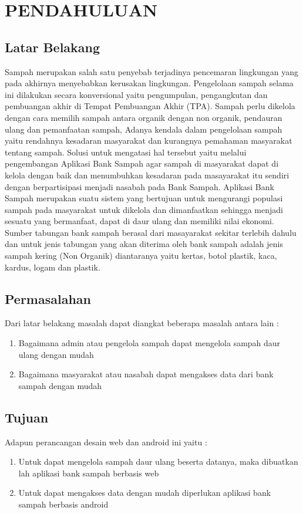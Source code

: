 \chapter{PENDAHULUAN}
\section{Latar Belakang}
\label{sec:latarbelakang} %

Sampah merupakan salah satu penyebab terjadinya pencemaran lingkungan yang pada akhirnya menyebabkan kerusakan lingkungan. Pengelolaan sampah selama ini dilakukan secara konversional yaitu pengumpulan, pengangkutan dan pembuangan akhir di Tempat Pembuangan Akhir (TPA). Sampah perlu dikelola dengan cara memilih sampah antara organik dengan non organik, pendauran ulang dan pemanfaatan sampah, Adanya kendala dalam pengelolaan sampah yaitu rendahnya kesadaran masyarakat dan kurangnya pemahaman masyarakat tentang sampah. Solusi untuk mengatasi hal tersebut yaitu melalui pengembangan Aplikasi Bank Sampah agar sampah di masyarakat dapat di kelola dengan baik dan menumbuhkan kesadaran pada masayarakat itu sendiri dengan berpartisipasi menjadi nasabah pada Bank Sampah.     
Aplikasi Bank Sampah merupakan suatu sistem yang bertujuan untuk mengurangi populasi sampah pada masyarakat untuk dikelola dan dimanfaatkan sehingga menjadi sesuatu yang bermanfaat, dapat di daur ulang dan memiliki nilai ekonomi. Sumber tabungan bank sampah berasal dari masayarakat sekitar terlebih dahulu dan untuk jenis tabungan yang akan diterima oleh bank sampah adalah jenis sampah kering (Non Organik) diantaranya yaitu kertas, botol plastik, kaca, kardus, logam dan plastik. 



\section{Permasalahan}
Dari latar belakang masalah dapat diangkat beberapa masalah antara lain :
\begin{enumerate}
\item Bagaimana admin atau pengelola sampah dapat mengelola sampah daur ulang dengan mudah
\item Bagaimana masyarakat atau nasabah dapat mengakses data dari bank sampah dengan mudah
\end{enumerate}


\section{Tujuan}
\label{sec:tujuan}
Adapun perancangan desain web dan android ini yaitu :
\begin{enumerate}
\item Untuk dapat mengelola sampah daur ulang beserta datanya, maka dibuatkan lah aplikasi bank sampah berbasis web
\item Untuk dapat mengakses data dengan mudah diperlukan aplikasi bank sampah berbasis android
\end{enumerate}


